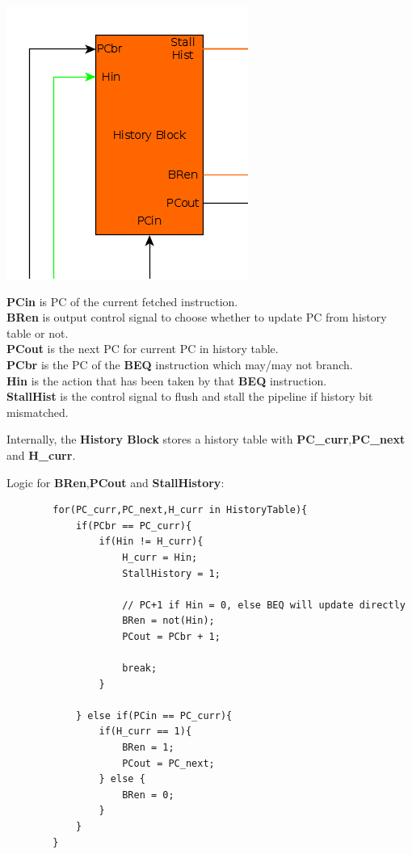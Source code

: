\documentclass{article}
\begin{document}
\includegraphics[scale=0.5]{history_block}

\textbf{PCin} is PC of the current fetched instruction.\\
\textbf{BRen} is output control signal to choose whether to update PC from
history table or not.\\
\textbf{PCout} is the next PC for current PC in history table.\\

\textbf{PCbr} is the PC of the \textbf{BEQ} instruction which may/may not branch.\\
\textbf{Hin} is the action that has been taken by that \textbf{BEQ} instruction.\\

\textbf{StallHist} is the control signal to flush and stall the pipeline if
history bit mismatched.

Internally, the \textbf{History Block} stores a history table with 
\textbf{PC\_curr},\textbf{PC\_next} and \textbf{H\_curr}.

Logic for \textbf{BRen},\textbf{PCout} and \textbf{StallHistory}:
    \begin{lstlisting}
        for(PC_curr,PC_next,H_curr in HistoryTable){
            if(PCbr == PC_curr){
                if(Hin != H_curr){
                    H_curr = Hin;
                    StallHistory = 1;

                    // PC+1 if Hin = 0, else BEQ will update directly
                    BRen = not(Hin);
                    PCout = PCbr + 1; 

                    break;
                }

            } else if(PCin == PC_curr){
                if(H_curr == 1){
                    BRen = 1;
                    PCout = PC_next;
                } else {
                    BRen = 0;
                }
            }
        }
    \end{lstlisting}
\end{document}

